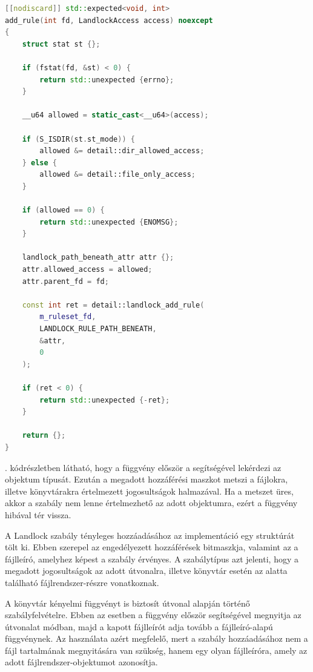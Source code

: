 \begin{lstlisting}[float, language=C++, caption={Landlock szabály hozzáadása fájlleíró alapján}, label={lst:landlock-add-rule}]
[[nodiscard]] std::expected<void, int>
add_rule(int fd, LandlockAccess access) noexcept
{
    struct stat st {};

    if (fstat(fd, &st) < 0) {
        return std::unexpected {errno};
    }

    __u64 allowed = static_cast<__u64>(access);

    if (S_ISDIR(st.st_mode)) {
        allowed &= detail::dir_allowed_access;
    } else {
        allowed &= detail::file_only_access;
    }

    if (allowed == 0) {
        return std::unexpected {ENOMSG};
    }

    landlock_path_beneath_attr attr {};
    attr.allowed_access = allowed;
    attr.parent_fd = fd;

    const int ret = detail::landlock_add_rule(
        m_ruleset_fd,
        LANDLOCK_RULE_PATH_BENEATH,
        &attr,
        0
    );

    if (ret < 0) {
        return std::unexpected {-ret};
    }

    return {};
}
\end{lstlisting}

. kódrészletben látható, hogy a függvény először a
 segítségével lekérdezi az objektum típusát. Ezután a megadott
hozzáférési maszkot metszi a fájlokra, illetve könyvtárakra értelmezett
jogosultságok halmazával. Ha a metszet üres, akkor a szabály nem lenne
értelmezhető az adott objektumra, ezért a függvény hibával tér vissza.

A Landlock szabály tényleges hozzáadásához az implementáció egy
 struktúrát tölt ki.
Ebben szerepel az engedélyezett hozzáférések bitmaszkja, valamint az a
fájlleíró, amelyhez képest a szabály érvényes. A
 szabálytípus azt jelenti,
hogy a megadott jogosultságok az adott útvonalra, illetve könyvtár esetén az
alatta található fájlrendszer-részre vonatkoznak.

A könyvtár kényelmi függvényt is biztosít útvonal alapján történő szabályfelvételre.
Ebben az esetben a függvény először  segítségével megnyitja az
útvonalat  módban, majd a kapott fájlleírót adja tovább a
fájlleíró-alapú  függvénynek. Az 
használata azért megfelelő, mert a szabály hozzáadásához nem a fájl tartalmának
megnyitására van szükség, hanem egy olyan fájlleíróra, amely az adott
fájlrendszer-objektumot azonosítja.

